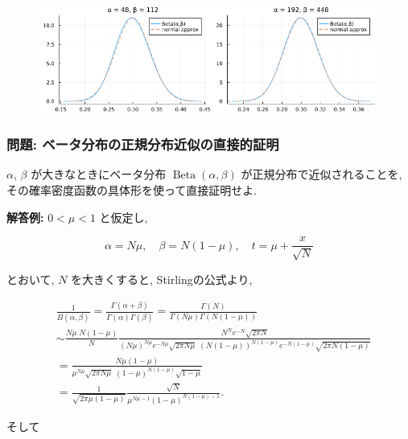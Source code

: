 \documentclass[
  letterpaper,
  DIV=11,
  numbers=noendperiod]{scrartcl}
\begin{document}
\begin{figure}[H]

{\centering \includegraphics{05 Central limit theorem_files/figure-pdf/cell-116-output-1.png}

}

\end{figure}

\hypertarget{ux554fux984c-ux30d9ux30fcux30bfux5206ux5e03ux306eux6b63ux898fux5206ux5e03ux8fd1ux4f3cux306eux76f4ux63a5ux7684ux8a3cux660e}{%
\subsubsection{問題:
ベータ分布の正規分布近似の直接的証明}\label{ux554fux984c-ux30d9ux30fcux30bfux5206ux5e03ux306eux6b63ux898fux5206ux5e03ux8fd1ux4f3cux306eux76f4ux63a5ux7684ux8a3cux660e}}

\(\alpha\), \(\beta\) が大きなときにベータ分布
\(\operatorname{Beta}(\alpha, \beta)\) が正規分布で近似されることを,
その確率密度函数の具体形を使って直接証明せよ.

\textbf{解答例:} \(0<\mu<1\) と仮定し,

\[
\alpha = N\mu, \quad
\beta = N(1-\mu), \quad
t = \mu + \frac{x}{\sqrt{N}}
\]

とおいて, \(N\) を大きくすると, Stirlingの公式より,

\[
\begin{aligned}
&
\frac{1}{B(\alpha,\beta)} =
\frac{\Gamma(\alpha+\beta)}{\Gamma(\alpha)\Gamma(\beta)} =
\frac{\Gamma(N)}{\Gamma(N\mu)\Gamma(N(1-\mu))}
\\ &\sim
\frac{N\mu\;N(1-\mu)}{N}
\frac
{N^N e^{-N} \sqrt{2\pi N}}
{
(N\mu)^{N\mu} e^{-N\mu} \sqrt{2\pi N\mu}\;
(N(1-\mu))^{N(1-\mu)} e^{-N(1-\mu)} \sqrt{2\pi N(1-\mu)}
}
\\ &=
\frac
{N\mu(1-\mu)}
{
\mu^{N\mu}\sqrt{2\pi N\mu}\;
(1-\mu)^{N(1-\mu)} \sqrt{1-\mu}
}
\\ &=
\frac{1}{\sqrt{2\pi\mu(1-\mu)}}
\frac{\sqrt{N}}{\mu^{N\mu-1} (1-\mu)^{N(1-\mu)-1}}.
\end{aligned}
\]

そして
\end{document}
